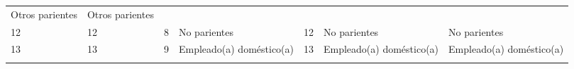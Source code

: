 \documentclass[
]{book}
\begin{document}
\begin{longtable}[]{@{}lllllll@{}}
\begin{minipage}[t]{0.16\columnwidth}
Otros parientes\strut
\end{minipage} & \begin{minipage}[t]{0.16\columnwidth}\raggedright
Otros parientes\strut
\end{minipage}\tabularnewline
\begin{minipage}[t]{0.10\columnwidth}\raggedright
12\strut
\end{minipage} & \begin{minipage}[t]{0.07\columnwidth}\raggedright
12\strut
\end{minipage} & \begin{minipage}[t]{0.07\columnwidth}\raggedright
8\strut
\end{minipage} & \begin{minipage}[t]{0.16\columnwidth}\raggedright
No parientes\strut
\end{minipage} & \begin{minipage}[t]{0.09\columnwidth}\raggedright
12\strut
\end{minipage} & \begin{minipage}[t]{0.16\columnwidth}\raggedright
No parientes\strut
\end{minipage} & \begin{minipage}[t]{0.16\columnwidth}\raggedright
No parientes\strut
\end{minipage}\tabularnewline
\begin{minipage}[t]{0.10\columnwidth}\raggedright
13\strut
\end{minipage} & \begin{minipage}[t]{0.07\columnwidth}\raggedright
13\strut
\end{minipage} & \begin{minipage}[t]{0.07\columnwidth}\raggedright
9\strut
\end{minipage} & \begin{minipage}[t]{0.16\columnwidth}\raggedright
Empleado(a) doméstico(a)\strut
\end{minipage} & \begin{minipage}[t]{0.09\columnwidth}\raggedright
13\strut
\end{minipage} & \begin{minipage}[t]{0.16\columnwidth}\raggedright
Empleado(a) doméstico(a)\strut
\end{minipage} & \begin{minipage}[t]{0.16\columnwidth}\raggedright
Empleado(a) doméstico(a)\strut
\end{minipage}\tabularnewline
\begin{minipage}[t]{0.10\columnwidth}\raggedright

\end{minipage}
\end{longtable}
\end{document}
